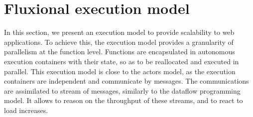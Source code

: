 \section{Fluxional execution model} \label{section:model}




In this section, we present an execution model to provide scalability to web applications.
To achieve this, the execution model provides a granularity of parallelism at the function level.
Functions are encapsulated in autonomous execution containers with their state, so as to be reallocated and executed in parallel.
This execution model is close to the actors model, as the execution containers are independent and communicate by messages.
The communications are assimilated to stream of messages, similarly to the dataflow programming model.
It allows to reason on the throughput of these streams, and to react to load increases.


